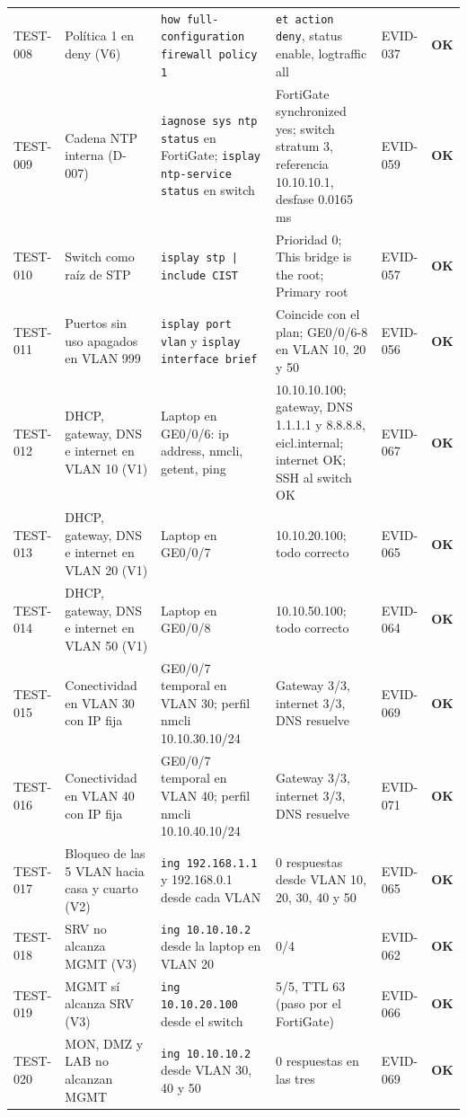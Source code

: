 \documentclass[11pt,a4paper]{article}
\newcommand{\estado}[1]{%
  \ifstrequal{#1}{COMPLETADA}{\textcolor{okgreen}{\textbf{\footnotesize #1}}}{%
  \ifstrequal{#1}{OPERATIVO VALIDADO}{\textcolor{okgreen}{\textbf{\footnotesize #1}}}{%
  \ifstrequal{#1}{OK}{\textcolor{okgreen}{\textbf{\footnotesize #1}}}{%
  \ifstrequal{#1}{RESUELTO}{\textcolor{okgreen}{\textbf{\footnotesize #1}}}{%
  \ifstrequal{#1}{EN CURSO}{\textcolor{amber}{\textbf{\footnotesize #1}}}{%
  \ifstrequal{#1}{REPORTADO}{\textcolor{amber}{\textbf{\footnotesize #1}}}{%
  \ifstrequal{#1}{NO EJECUTADA}{\textcolor{muted}{\textbf{\footnotesize #1}}}{%
  \ifstrequal{#1}{PROPUESTO}{\textcolor{violet}{\textbf{\footnotesize #1}}}{%
  \ifstrequal{#1}{PENDIENTE}{\textcolor{alertred}{\textbf{\footnotesize #1}}}{%
  \textbf{\footnotesize #1}}}}}}}}}}}
\newcommand{\fn}[1]{\texttt{\fnbreaks#1\fnend}}
\def\fnbreaks#1\fnend{\begingroup\fnactive\scantokens{#1\noexpand}\endgroup}
\gdef\fnactive{\catcode`\-=\active\catcode`\/=\active
  \def-{\char`\-\allowbreak}\def/{\char`\/\allowbreak}\let\_\fnus}
\newcommand{\fnus}{\textunderscore\allowbreak}
\begin{document}
{\begin{longtable}{L{1.35cm} L{2.7cm} L{3.15cm} L{3.6cm} L{1.4cm} L{2.4cm}}
  TEST-008 & Política 1 en deny (V6) & \fn{show full-configuration firewall policy 1} & \fn{set action deny}, status enable, logtraffic all & EVID-037 & \estado{OK}\\
  TEST-009 & Cadena NTP interna (D-007) & \fn{diagnose sys ntp status} en FortiGate; \fn{display ntp-service status} en switch & FortiGate synchronized yes; switch stratum 3, referencia 10.10.10.1, desfase 0.0165 ms & EVID-059 & \estado{OK}\\
  TEST-010 & Switch como raíz de STP & \fn{display stp | include CIST} & Prioridad 0; This bridge is the root; Primary root & EVID-057 & \estado{OK}\\
  TEST-011 & Puertos sin uso apagados en VLAN 999 & \fn{display port vlan} y \fn{display interface brief} & Coincide con el plan; GE0/0/6-8 en VLAN 10, 20 y 50 & EVID-056 & \estado{OK}\\
  TEST-012 & DHCP, gateway, DNS e internet en VLAN 10 (V1) & Laptop en GE0/0/6: ip address, nmcli, getent, ping & 10.10.10.100; gateway, DNS 1.1.1.1 y 8.8.8.8, eicl.internal; internet OK; SSH al switch OK & EVID-067 & \estado{OK}\\
  TEST-013 & DHCP, gateway, DNS e internet en VLAN 20 (V1) & Laptop en GE0/0/7 & 10.10.20.100; todo correcto & EVID-065 & \estado{OK}\\
  TEST-014 & DHCP, gateway, DNS e internet en VLAN 50 (V1) & Laptop en GE0/0/8 & 10.10.50.100; todo correcto & EVID-064 & \estado{OK}\\
  TEST-015 & Conectividad en VLAN 30 con IP fija & GE0/0/7 temporal en VLAN 30; perfil nmcli 10.10.30.10/24 & Gateway 3/3, internet 3/3, DNS resuelve & EVID-069 & \estado{OK}\\
  TEST-016 & Conectividad en VLAN 40 con IP fija & GE0/0/7 temporal en VLAN 40; perfil nmcli 10.10.40.10/24 & Gateway 3/3, internet 3/3, DNS resuelve & EVID-071 & \estado{OK}\\
  TEST-017 & Bloqueo de las 5 VLAN hacia casa y cuarto (V2) & \fn{ping 192.168.1.1} y 192.168.0.1 desde cada VLAN & 0 respuestas desde VLAN 10, 20, 30, 40 y 50 & EVID-065 & \estado{OK}\\
  TEST-018 & SRV no alcanza MGMT (V3) & \fn{ping 10.10.10.2} desde la laptop en VLAN 20 & 0/4 & EVID-062 & \estado{OK}\\
  TEST-019 & MGMT sí alcanza SRV (V3) & \fn{ping 10.10.20.100} desde el switch & 5/5, TTL 63 (paso por el FortiGate) & EVID-066 & \estado{OK}\\
  TEST-020 & MON, DMZ y LAB no alcanzan MGMT & \fn{ping 10.10.10.2} desde VLAN 30, 40 y 50 & 0 respuestas en las tres & EVID-069 & \estado{OK}\\

\end{longtable}}
\end{document}
